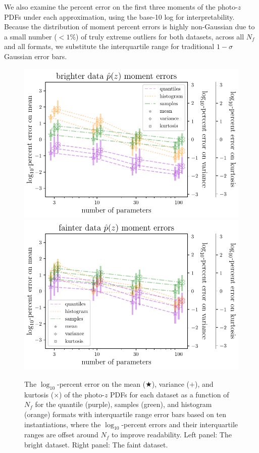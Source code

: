 \documentclass[\docopts]{\docclass}
\newcommand{\pz}{photo-$z$ PDF}
\newcommand{\mgdata}{bright\xspace}
\newcommand{\ssdata}{faint\xspace}
\begin{document}
We also examine the percent error on the first three moments of the \pz s under 
each approximation, using the base-10 log for interpretability.
Because the distribution of moment percent errors is highly non-Gaussian due to 
a small number ($<1\%$) of truly extreme outliers for both datasets, across all 
$N_{f}$ and all formats, we substitute the interquartile range for traditional 
$1-\sigma$ Gaussian error bars.
\begin{figure}
  \begin{center}
    \includegraphics[width=\columnwidth]{graham_pz_err.pdf}
    \includegraphics[width=\columnwidth]{schmidt_pz_err.pdf}
    \caption{
   The $\log_{10}$-percent error on the mean ($\bigstar$), variance ($+$), and 
kurtosis ($\times$) of the \pz s for each dataset as a function of $N_{f}$ for 
the quantile (purple), samples (green), and histogram (orange) formats with 
interquartile range error bars based on ten instantiations, where the 
$\log_{10}$-percent errors and their interquartile ranges are offset around 
$N_{f}$ to improve readability.
   Left panel: The \mgdata dataset.
   Right panel: The \ssdata dataset.
    \label{fig:pz_moment_errs}}
  \end{center}
\end{figure}
\end{document}
